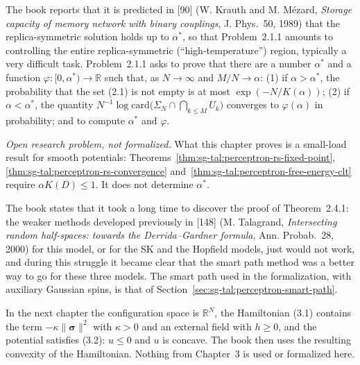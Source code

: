 \begin{remark}\label{rem:sg-tal:perceptron-notes-problem-211}
The book reports that it is predicted in [90] (W. Krauth and M. M\'ezard, \emph{Storage capacity of memory
network with binary couplings}, J. Phys.~50, 1989) that the replica-symmetric solution holds up to
$\alpha^*$, so that Problem~2.1.1 amounts to controlling the entire replica-symmetric (``high-temperature'')
region, typically a very difficult task. Problem~2.1.1 asks to prove that there are a number $\alpha^*$ and a
function $\varphi:[0,\alpha^*)\to\mathbb R$ such that, as $N\to\infty$ and $M/N\to\alpha$: (1) if $\alpha>\alpha^*$, the
probability that the set (2.1) is not empty is at most $\exp(-N/K(\alpha))$; (2) if $\alpha<\alpha^*$, the quantity
$N^{-1}\log\mathrm{card}\bigl(\Sigma_N\cap\bigcap_{k\le M}U_k\bigr)$ converges to $\varphi(\alpha)$ in probability; and to
compute $\alpha^*$ and $\varphi$.

\emph{Open research problem, not formalized.} What this chapter proves is a small-load result for smooth
potentials: Theorems~\ref{thm:sg-tal:perceptron-rs-fixed-point}, \ref{thm:sg-tal:perceptron-rs-convergence}
and~\ref{thm:sg-tal:perceptron-free-energy-clt} require $\alpha K(D)\le1$. It does not determine $\alpha^*$.
\end{remark}

\begin{remark}\label{rem:sg-tal:perceptron-notes-smart-path}
The book states that it took a long time to discover the proof of Theorem~2.4.1: the weaker methods developed
previously in [148] (M. Talagrand, \emph{Intersecting random half-spaces: towards the Derrida--Gardner formula},
Ann. Probab.~28, 2000) for this model, or for the SK and the Hopfield models, just would not work, and during
this struggle it became clear that the smart path method was a better way to go for these three models. The
smart path used in the formalization, with auxiliary Gaussian spins, is that of
Section~\ref{sec:sg-tal:perceptron-smart-path}.
\end{remark}

\begin{remark}\label{rem:sg-tal:perceptron-notes-chapter3}
In the next chapter the configuration space is $\mathbb R^N$, the Hamiltonian (3.1) contains the term
$-\kappa\|\boldsymbol\sigma\|^2$ with $\kappa>0$ and an external field with $h\ge0$, and the potential satisfies
(3.2): $u\le0$ and $u$ is concave. The book then uses the resulting convexity of the Hamiltonian. Nothing from
Chapter~3 is used or formalized here.
\end{remark}

